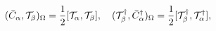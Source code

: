 \begin{equation}\label{5.22}
(\bar{C}_\alpha,{\cal T}_\beta)_\Omega=\frac{1}{2}[{\cal T}_\alpha,
{\cal T}_\beta],\quad
({\cal T}^\dagger_\beta,\bar{C}^\dagger_\alpha)_\Omega=\frac{1}{2}
[{\cal T}^\dagger_\beta,{\cal T}^\dagger_\alpha],
\end{equation}

